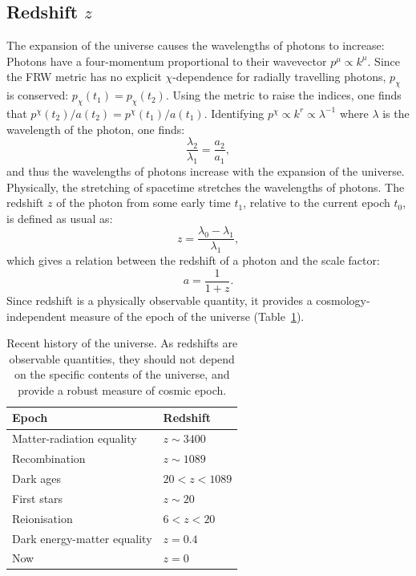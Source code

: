 \subsection{Redshift $z$}
The expansion of the universe causes the wavelengths of photons to increase: Photons have a four-momentum proportional to their wavevector $p^\mu \propto k^\mu$. Since the FRW metric has no explicit $\chi$-dependence for radially travelling photons, $p_\chi$ is conserved: $p_\chi(t_1) = p_\chi(t_2)$. Using the metric to raise the indices, one finds that $p^\chi(t_2)/a(t_2)=p^\chi(t_1)/a(t_1)$. Identifying ${p^\chi \propto k^r \propto \lambda^{-1}}$ where $\lambda$ is the wavelength of the photon, one finds:
\begin{equation}
  \frac{\lambda_2}{\lambda_1} = \frac{a_2}{a_1},
\end{equation}
and thus the wavelengths of photons increase with the expansion of the universe. Physically, the stretching of spacetime stretches the wavelengths of photons.
The redshift $z$ of the photon from some early time $t_1$, relative to the current epoch $t_0$, is defined as usual as:
\begin{equation}
  z = \frac{\lambda_0-\lambda_1}{\lambda_1},
\end{equation}
which gives a relation between the redshift of a photon and the scale factor:
\begin{equation}
  a = \frac{1}{1+z}.
\end{equation}
Since redshift is a physically observable quantity, it provides a cosmology-independent measure of the epoch of the universe (Table~\ref{tab:cos:universe_timeline}).
\begin{table}
  \centering
\begin{tabular}{ll}
 \toprule
  Epoch & Redshift \\
 \midrule
 \midrule
 Matter-radiation equality &
 $z\sim3400$
 \\
 Recombination &
 $z\sim1089$
 \\
 Dark ages &
 $20<z<1089$
 \\
 First stars &
 $z\sim20$
 \\
 Reionisation &
 $6<z<20$
 \\
 Dark energy-matter equality &
 $z=0.4$
 \\
 Now &
 $z=0$
 \\
 \bottomrule
\end{tabular}
\caption{Recent history of the universe. As redshifts are observable quantities, they should not depend on the specific contents of the universe, and provide a robust measure of cosmic epoch.}\label{tab:cos:universe_timeline}
\end{table}

